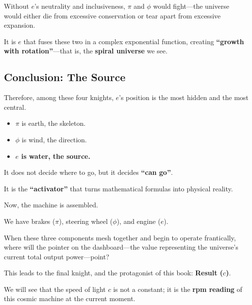 Without $e$'s neutrality and inclusiveness, $\pi$ and $\phi$ would fight---the universe would either die from excessive conservation or tear apart from excessive expansion.

It is $e$ that fuses these two in a complex exponential function, creating \textbf{``growth with rotation''}---that is, the \textbf{spiral universe} we see.

\subsection{Conclusion: The Source}

Therefore, among these four knights, $e$'s position is the most hidden and the most central.

\begin{itemize}
\item $\pi$ is earth, the skeleton.

\item $\phi$ is wind, the direction.

\item \textbf{$e$ is water, the source.}
\end{itemize}

It does not decide where to go, but it decides \textbf{``can go''}.

It is the \textbf{``activator''} that turns mathematical formulas into physical reality.

Now, the machine is assembled.

We have brakes ($\pi$), steering wheel ($\phi$), and engine ($e$).

When these three components mesh together and begin to operate frantically, where will the pointer on the dashboard---the value representing the universe's current total output power---point?

This leads to the final knight, and the protagonist of this book: \textbf{Result ($c$)}.

We will see that the speed of light $c$ is not a constant; it is the \textbf{rpm reading} of this cosmic machine at the current moment.

